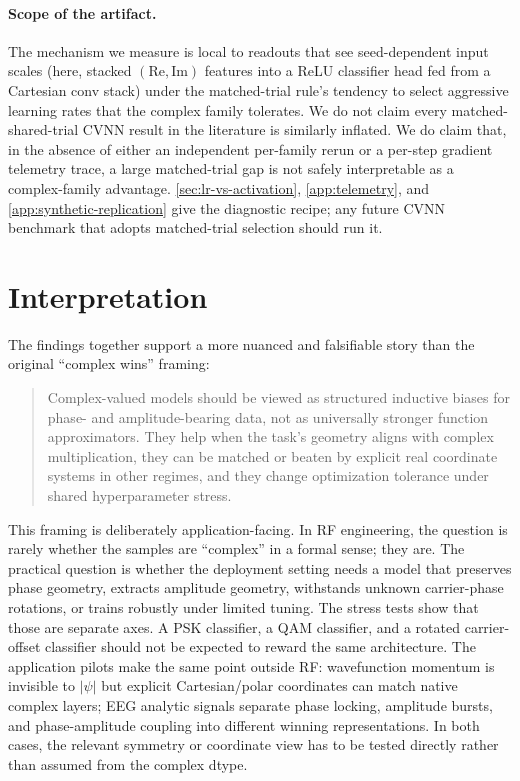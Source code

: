 \documentclass{article}
\providecommand{\Cref}[1]{\autoref{#1}}
\begin{document}
\paragraph{Scope of the artifact.}
The mechanism we measure is local to readouts that see
seed-dependent input scales (here, stacked $(\mathrm{Re},\mathrm{Im})$
features into a ReLU classifier head fed from a Cartesian conv stack)
under the matched-trial rule's tendency to select aggressive learning
rates that the complex family tolerates. We do not claim every
matched-shared-trial CVNN result in the literature is similarly
inflated. We do claim that, in the absence of either an independent
per-family rerun or a per-step gradient telemetry trace, a large
matched-trial gap is not safely interpretable as a complex-family
advantage. \Cref{sec:lr-vs-activation}, \Cref{app:telemetry}, and
\Cref{app:synthetic-replication}
give the diagnostic recipe; any future CVNN benchmark that adopts
matched-trial selection should run it.

\section{Interpretation}
\label{sec:interpretation}

The findings together support a more nuanced and falsifiable story
than the original ``complex wins'' framing:

\begin{quote}
  Complex-valued models should be viewed as structured inductive
  biases for phase- and amplitude-bearing data, not as universally
  stronger function approximators. They help when the task's geometry
  aligns with complex multiplication, they can be matched or beaten by
  explicit real coordinate systems in other regimes, and they change
  optimization tolerance under shared hyperparameter stress.
\end{quote}

This framing is deliberately application-facing. In RF engineering, the
question is rarely whether the samples are ``complex'' in a formal
sense; they are. The practical question is whether the deployment
setting needs a model that preserves phase geometry, extracts amplitude
geometry, withstands unknown carrier-phase rotations, or trains
robustly under limited tuning. The stress tests show that those are
separate axes. A PSK classifier, a QAM classifier, and a rotated
carrier-offset classifier should not be expected to reward the same
architecture. The application pilots make the same point outside RF:
wavefunction momentum is invisible to $|\psi|$ but explicit
Cartesian/polar coordinates can match native complex layers; EEG
analytic signals separate phase locking, amplitude bursts, and
phase-amplitude coupling into different winning representations.
In both cases, the relevant symmetry or coordinate view has to be
tested directly rather than assumed from the complex dtype.
\end{document}
